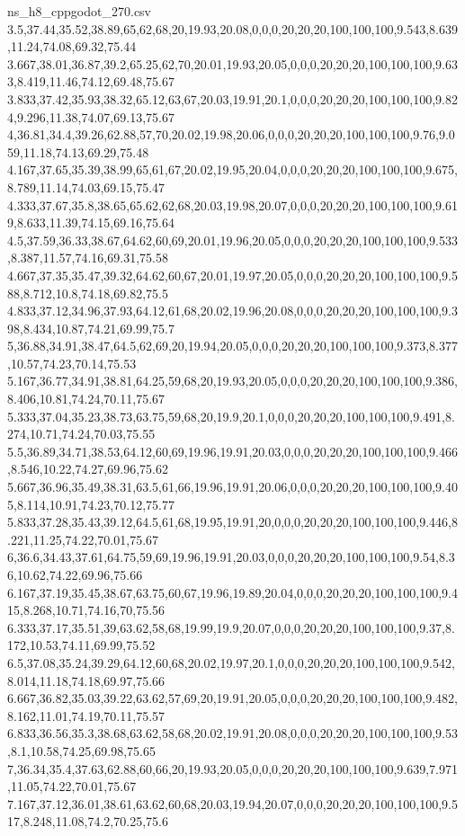 \begin{filecontents*}[overwrite]{ns_h8_cppgodot_270.csv}
3.5,37.44,35.52,38.89,65,62,68,20,19.93,20.08,0,0,0,20,20,20,100,100,100,9.543,8.639,11.24,74.08,69.32,75.44
3.667,38.01,36.87,39.2,65.25,62,70,20.01,19.93,20.05,0,0,0,20,20,20,100,100,100,9.633,8.419,11.46,74.12,69.48,75.67
3.833,37.42,35.93,38.32,65.12,63,67,20.03,19.91,20.1,0,0,0,20,20,20,100,100,100,9.824,9.296,11.38,74.07,69.13,75.67
4,36.81,34.4,39.26,62.88,57,70,20.02,19.98,20.06,0,0,0,20,20,20,100,100,100,9.76,9.059,11.18,74.13,69.29,75.48
4.167,37.65,35.39,38.99,65,61,67,20.02,19.95,20.04,0,0,0,20,20,20,100,100,100,9.675,8.789,11.14,74.03,69.15,75.47
4.333,37.67,35.8,38.65,65.62,62,68,20.03,19.98,20.07,0,0,0,20,20,20,100,100,100,9.619,8.633,11.39,74.15,69.16,75.64
4.5,37.59,36.33,38.67,64.62,60,69,20.01,19.96,20.05,0,0,0,20,20,20,100,100,100,9.533,8.387,11.57,74.16,69.31,75.58
4.667,37.35,35.47,39.32,64.62,60,67,20.01,19.97,20.05,0,0,0,20,20,20,100,100,100,9.588,8.712,10.8,74.18,69.82,75.5
4.833,37.12,34.96,37.93,64.12,61,68,20.02,19.96,20.08,0,0,0,20,20,20,100,100,100,9.398,8.434,10.87,74.21,69.99,75.7
5,36.88,34.91,38.47,64.5,62,69,20,19.94,20.05,0,0,0,20,20,20,100,100,100,9.373,8.377,10.57,74.23,70.14,75.53
5.167,36.77,34.91,38.81,64.25,59,68,20,19.93,20.05,0,0,0,20,20,20,100,100,100,9.386,8.406,10.81,74.24,70.11,75.67
5.333,37.04,35.23,38.73,63.75,59,68,20,19.9,20.1,0,0,0,20,20,20,100,100,100,9.491,8.274,10.71,74.24,70.03,75.55
5.5,36.89,34.71,38.53,64.12,60,69,19.96,19.91,20.03,0,0,0,20,20,20,100,100,100,9.466,8.546,10.22,74.27,69.96,75.62
5.667,36.96,35.49,38.31,63.5,61,66,19.96,19.91,20.06,0,0,0,20,20,20,100,100,100,9.405,8.114,10.91,74.23,70.12,75.77
5.833,37.28,35.43,39.12,64.5,61,68,19.95,19.91,20,0,0,0,20,20,20,100,100,100,9.446,8.221,11.25,74.22,70.01,75.67
6,36.6,34.43,37.61,64.75,59,69,19.96,19.91,20.03,0,0,0,20,20,20,100,100,100,9.54,8.36,10.62,74.22,69.96,75.66
6.167,37.19,35.45,38.67,63.75,60,67,19.96,19.89,20.04,0,0,0,20,20,20,100,100,100,9.415,8.268,10.71,74.16,70,75.56
6.333,37.17,35.51,39,63.62,58,68,19.99,19.9,20.07,0,0,0,20,20,20,100,100,100,9.37,8.172,10.53,74.11,69.99,75.52
6.5,37.08,35.24,39.29,64.12,60,68,20.02,19.97,20.1,0,0,0,20,20,20,100,100,100,9.542,8.014,11.18,74.18,69.97,75.66
6.667,36.82,35.03,39.22,63.62,57,69,20,19.91,20.05,0,0,0,20,20,20,100,100,100,9.482,8.162,11.01,74.19,70.11,75.57
6.833,36.56,35.3,38.68,63.62,58,68,20.02,19.91,20.08,0,0,0,20,20,20,100,100,100,9.53,8.1,10.58,74.25,69.98,75.65
7,36.34,35.4,37.63,62.88,60,66,20,19.93,20.05,0,0,0,20,20,20,100,100,100,9.639,7.971,11.05,74.22,70.01,75.67
7.167,37.12,36.01,38.61,63.62,60,68,20.03,19.94,20.07,0,0,0,20,20,20,100,100,100,9.517,8.248,11.08,74.2,70.25,75.6

\end{filecontents*}
